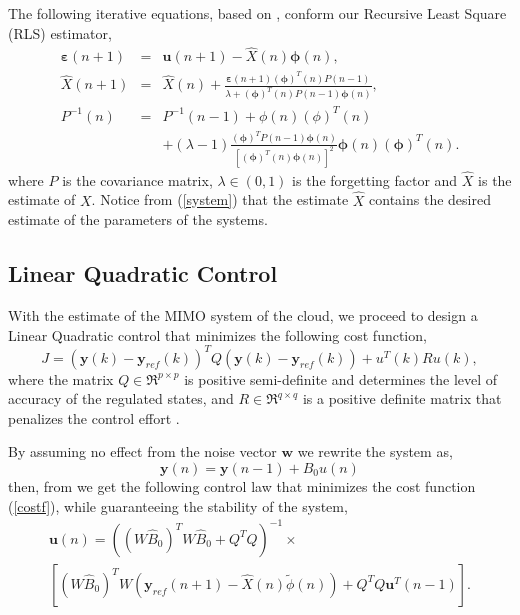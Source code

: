 \documentclass{sig-alternate}
\begin{document}
The following iterative equations, based on \cite{Kulhavy-1987}, conform our Recursive Least Square (RLS)
estimator,
\begin{eqnarray}
 \mathbf{\varepsilon}(n+1) & = & \mathbf{u}(n+1) - \hat{X}(n)\mathbf{\phi}(n), \nonumber \\
\hat{X}(n+1) & = & \hat{X}(n)+\frac{\mathbf{\varepsilon}(n+1)(\mathbf{\phi})^{T}(n)P(n-1)}{\lambda + (\mathbf{\phi})^{T}(n)P(n-1)\mathbf{\phi}(n)}, \nonumber \\
P^{-1}(n) & = & P^{-1}(n-1) + \phi(n)(\phi)^{T}(n) \nonumber \\
& & + (\lambda - 1) \frac{(\mathbf{\phi})^{T}P(n-1)\mathbf{\phi}(n)}{[(\mathbf{\phi})^{T}(n)\mathbf{\phi}(n)]^{2}} \mathbf{\phi}(n)(\mathbf{\phi})^{T}(n) \nonumber.
\end{eqnarray}
where $P$ is the covariance matrix, $\lambda \in (0,1)$ is the forgetting factor and $\hat{X}$ is the estimate of $X$.
Notice from (\ref{system}) that the estimate $\hat{X}$ contains the desired estimate of the parameters of the systems.

\subsection{Linear Quadratic Control}
With the estimate of the MIMO system of the cloud, we proceed to design a Linear Quadratic control that minimizes the 
following cost function,
\begin{equation}
 J = (\mathbf{y}(k)-\mathbf{y}_{ref}(k))^{T}Q(\mathbf{y}(k)-\mathbf{y}_{ref}(k)) + u^{T}(k)Ru(k), \label{costf}
\end{equation}
where the matrix $Q \in \Re^{p \times p}$ is positive semi-definite and determines the level of accuracy of the regulated 
states, and $R \in \Re^{q \times q}$ is a positive definite matrix that penalizes the control effort \cite{Dorato-2000}.

By assuming no effect from the noise vector $\mathbf{w}$ we rewrite the system as,
\begin{displaymath}
 \mathbf{y}(n) = \mathbf{y}(n-1) + B_{0}u(n)
\end{displaymath}
then, from \cite{Liu-2007} we get the following control law that minimizes the cost function (\ref{costf}), while guaranteeing the stability
of the system,
\begin{eqnarray}
 &\mathbf{u}(n) = \left( (W\hat{B}_{0})^{T}W\hat{B}_{0}+Q^{T}Q \right)^{-1} \times& \nonumber \\ 
 &\left[ (W\hat{B}_{0})^{T}W \left(\mathbf{y}_{ref}(n+1) -\hat{X}(n)\tilde{\phi}(n) \right) + Q^{T}Q \mathbf{u}^{T}(n-1) \right].& \nonumber
\end{eqnarray}
\end{document}

